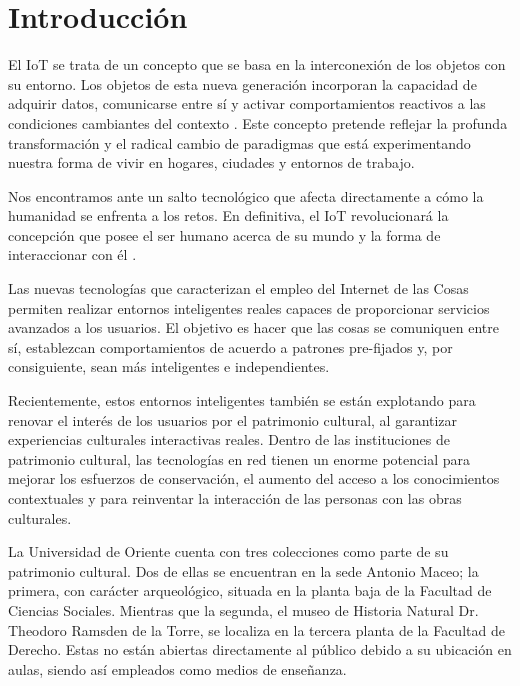 \renewcommand{\thepage}{\arabic{page}}

    \section*{\LARGE Introducción}

    \setcounter{page}{1} %
    \pagestyle{plain} %

    El IoT se trata de un concepto que se basa en la interconexión de los objetos con su entorno. Los objetos de esta nueva generación incorporan la capacidad de adquirir datos, comunicarse entre sí y activar comportamientos reactivos a las condiciones cambiantes del contexto \cite{agriculturaPrecision}. Este concepto pretende reflejar la profunda transformación y el radical cambio de paradigmas que está experimentando nuestra forma de vivir en hogares, ciudades y entornos de trabajo.

    Nos encontramos ante un salto tecnológico que afecta directamente a cómo la humanidad se enfrenta a los retos. En definitiva, el IoT revolucionará la concepción que posee el ser humano acerca de su mundo y la forma de interaccionar con él \cite{revolucionDefinitiva}.

    Las nuevas tecnologías que caracterizan el empleo del Internet de las Cosas permiten realizar entornos inteligentes reales capaces de proporcionar servicios avanzados a los usuarios. El objetivo es hacer que las cosas se comuniquen entre sí, establezcan comportamientos de acuerdo a patrones pre-fijados y, por consiguiente, sean más inteligentes e independientes.

    Recientemente, estos entornos inteligentes también se están explotando para renovar el interés de los usuarios por el patrimonio cultural, al garantizar experiencias culturales interactivas reales. Dentro de las instituciones de patrimonio cultural, las tecnologías en red tienen un enorme potencial para mejorar los esfuerzos de conservación, el aumento del acceso a los conocimientos contextuales y para reinventar la interacción de las personas con las obras culturales.

    La Universidad de Oriente cuenta con tres colecciones como parte de su patrimonio cultural. Dos de ellas se encuentran en la sede Antonio Maceo; la primera, con carácter arqueológico, situada en la planta baja de la Facultad de Ciencias Sociales. Mientras que la segunda, el museo de Historia Natural Dr. Theodoro Ramsden de la Torre, se localiza en la tercera planta de la Facultad de Derecho. Estas no están abiertas directamente al público debido a su ubicación en aulas, siendo así empleados como medios de enseñanza.

